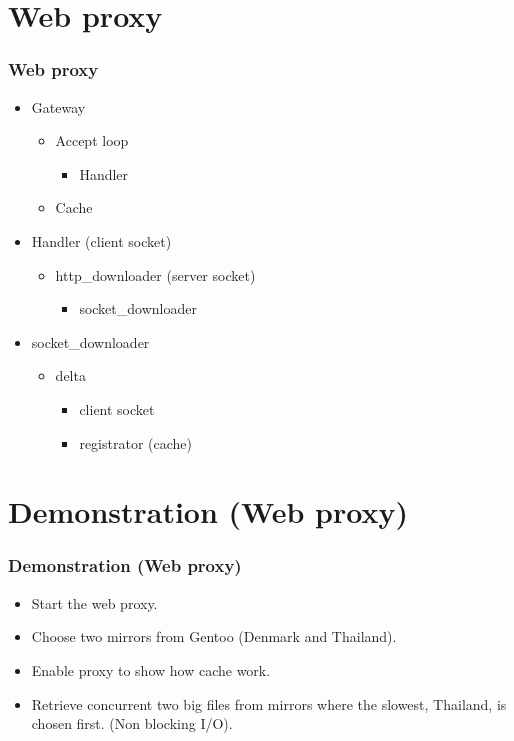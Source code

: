 \documentclass{beamer}
\begin{document}
\section[Web proxy]{Web proxy}
\begin{frame}
  \frametitle{Web proxy}
  \begin{itemize}
    \item Gateway
      \begin{itemize}
        \item Accept loop
          \begin{itemize}
            \item Handler
          \end{itemize}
        \item Cache
      \end{itemize}
  \end{itemize}
  \begin{itemize}
    \item Handler (client socket) 
      \begin{itemize}
        \item http\_downloader (server socket)
          \begin{itemize}
          \item socket\_downloader
          \end{itemize}
      \end{itemize}
  \end{itemize}
  \begin{itemize}
    \item socket\_downloader
      \begin{itemize}
        \item delta
          \begin{itemize}
            \item client socket
            \item registrator (cache)
          \end{itemize}
      \end{itemize}
  \end{itemize}
\end{frame}


\section[Demo]{Demonstration (Web proxy)}
\begin{frame}
  \frametitle{Demonstration (Web proxy)}
  \begin{itemize}
    \item Start the web proxy.
    \item Choose two mirrors from Gentoo (Denmark and Thailand).
    \item Enable proxy to show how cache work.
    \item Retrieve concurrent two big files from mirrors where the slowest,
      Thailand, is chosen first. (Non blocking I/O).
  \end{itemize}
\end{frame}
\end{document}
